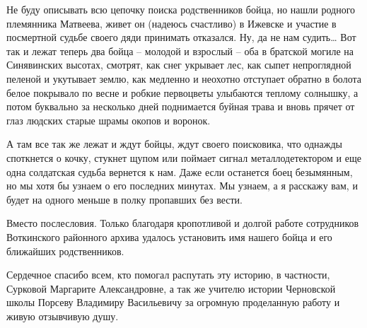 Не буду описывать всю цепочку поиска родственников бойца, но нашли родного
племянника Матвеева, живет он (надеюсь счастливо) в Ижевске и участие в
посмертной судьбе своего дяди принимать отказался. Ну, да не нам судить… Вот
так и лежат теперь два бойца – молодой и взрослый – оба в братской могиле на
Синявинских высотах, смотрят, как снег укрывает лес, как сыпет непроглядной
пеленой и укутывает землю, как медленно и неохотно отступает обратно в болота
белое покрывало по весне и робкие первоцветы улыбаются теплому солнышку, а
потом буквально за несколько дней поднимается буйная трава и вновь прячет от
глаз людских старые шрамы окопов и воронок.

А там все так же лежат и ждут бойцы, ждут своего поисковика, что однажды
споткнется о кочку, стукнет щупом или поймает сигнал металлодетектором и еще
одна солдатская судьба вернется к нам. Даже если останется боец безымянным, но
мы хотя бы узнаем о его последних минутах. Мы узнаем, а я расскажу вам, и будет
на одного меньше в полку пропавших без вести.

Вместо послесловия. Только благодаря кропотливой и долгой работе сотрудников
Воткинского районного архива удалось установить имя нашего бойца и его
ближайших родственников.

Сердечное спасибо всем, кто помогал распутать эту историю, в частности,
Сурковой Маргарите Александровне, а так же учителю истории Черновской школы
Порсеву Владимиру Васильевичу за огромную проделанную работу и живую отзывчивую
душу.


